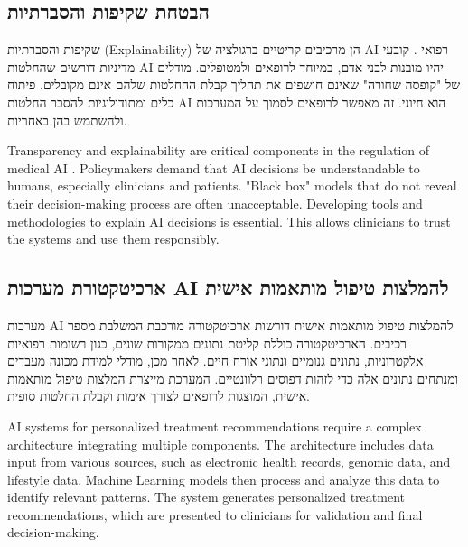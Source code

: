 \documentclass[12pt,a4paper]{article}
\newenvironment{hebrewblock}{%
  \begin{tcolorbox}[enhanced,breakable,title={\hebrewfont עברית},
    colback=blue!3!white,colframe=blue!35!white,fonttitle=\bfseries,
    attach boxed title to top right={yshift=-2.5mm,xshift=-4mm},
    boxed title style={colback=blue!35!white,sharp corners}]
  \begin{hebrew}
}{%
  \end{hebrew}\end{tcolorbox}\medskip
}
\newenvironment{englishblock}{%
  \begin{tcolorbox}[enhanced,breakable,title={English Translation},
    colback=gray!4!white,colframe=gray!40!white,fonttitle=\bfseries]
}{%
  \end{tcolorbox}\medskip
}
\begin{document}
\subsection{\texthebrew{הבטחת שקיפות והסברתיות}}
\begin{hebrewblock}
שקיפות והסברתיות (Explainability) הן מרכיבים קריטיים ברגולציה של AI רפואי \cite{nih_ethical_implications}. קובעי מדיניות דורשים שהחלטות AI יהיו מובנות לבני אדם, במיוחד לרופאים ולמטופלים. מודלים של "קופסה שחורה" שאינם חושפים את תהליך קבלת ההחלטות שלהם אינם מקובלים. פיתוח כלים ומתודולוגיות להסבר החלטות AI הוא חיוני. זה מאפשר לרופאים לסמוך על המערכות ולהשתמש בהן באחריות.
\end{hebrewblock}
\begin{englishblock}
Transparency and explainability are critical components in the regulation of medical AI \cite{nih_ethical_implications}. Policymakers demand that AI decisions be understandable to humans, especially clinicians and patients. "Black box" models that do not reveal their decision-making process are often unacceptable. Developing tools and methodologies to explain AI decisions is essential. This allows clinicians to trust the systems and use them responsibly.
\end{englishblock}

\subsection{\texthebrew{ארכיטקטורת מערכות AI להמלצות טיפול מותאמות אישית}}
\begin{hebrewblock}
מערכות AI להמלצות טיפול מותאמות אישית דורשות ארכיטקטורה מורכבת המשלבת מספר רכיבים. הארכיטקטורה כוללת קליטת נתונים ממקורות שונים, כגון רשומות רפואיות אלקטרוניות, נתונים גנומיים ונתוני אורח חיים. לאחר מכן, מודלי למידת מכונה מעבדים ומנתחים נתונים אלה כדי לזהות דפוסים רלוונטיים. המערכת מייצרת המלצות טיפול מותאמות אישית, המוצגות לרופאים לצורך אימות וקבלת החלטות סופית.
\end{hebrewblock}
\begin{englishblock}
AI systems for personalized treatment recommendations require a complex architecture integrating multiple components. The architecture includes data input from various sources, such as electronic health records, genomic data, and lifestyle data. Machine Learning models then process and analyze this data to identify relevant patterns. The system generates personalized treatment recommendations, which are presented to clinicians for validation and final decision-making.
\end{englishblock}
\end{document}

